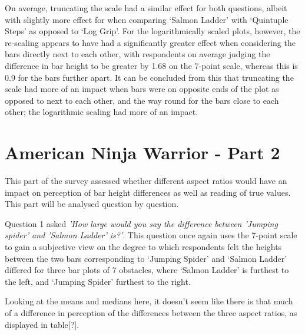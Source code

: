 \documentclass[
]{article}
\newenvironment{Shaded}{\begin{snugshade}}{\end{snugshade}}
\newcommand{\DecValTok}[1]{\textcolor[rgb]{0.00,0.00,0.81}{#1}}
\newcommand{\KeywordTok}[1]{\textcolor[rgb]{0.13,0.29,0.53}{\textbf{#1}}}
\newcommand{\NormalTok}[1]{#1}
\newcommand{\OperatorTok}[1]{\textcolor[rgb]{0.81,0.36,0.00}{\textbf{#1}}}
\newcommand{\StringTok}[1]{\textcolor[rgb]{0.31,0.60,0.02}{#1}}
\begin{document}
On average, truncating the scale had a similar effect for both
questions, albeit with slightly more effect for when comparing `Salmon
Ladder' with `Quintuple Steps' as opposed to `Log Grip'. For the
logarithmically scaled plots, however, the re-scaling appears to have
had a significantly greater effect when considering the bars directly
next to each other, with respondents on average judging the difference
in bar height to be greater by 1.68 on the 7-point scale, whereas this
is 0.9 for the bars further apart. It can be concluded from this that
truncating the scale had more of an impact when bars were on opposite
ends of the plot as opposed to next to each other, and the way round for
the bars close to each other; the logarithmic scaling had more of an
impact.

\section{American Ninja Warrior - Part 2}

This part of the survey assessed whether different aspect ratios would
have an impact on perception of bar height differences as well as
reading of true values. This part will be analysed question by question.

Question 1 asked
\textit{'How large would you say the difference between 'Jumping spider' and 'Salmon Ladder' is?'}.
This question once again uses the 7-point scale to gain a subjective
view on the degree to which respondents felt the heights between the two
bars corresponding to `Jumping Spider' and `Salmon Ladder' differed for
three bar plots of 7 obstacles, where `Salmon Ladder' is furthest to the
left, and `Jumping Spider' furthest to the right.

\begin{Shaded}
\end{Shaded}

Looking at the means and medians here, it doesn't seem like there is
that much of a difference in perception of the differences between the
three aspect ratios, as displayed in table{[}?{]}.
\end{document}
